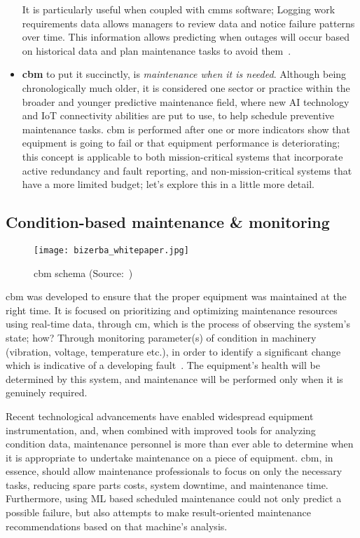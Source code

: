 \begin{itemize}
          It is particularly useful when coupled with \acs{cmms} software; Logging work requirements data allows managers to review data and notice failure patterns over time.
          This information allows predicting when outages will occur based on historical data and plan maintenance tasks to avoid them~\cite{Misc:trout_2019_preventive}.
    \item \textbf{\ac{cbm}} to put it succinctly, is \textit{maintenance when it is needed}. Although being chronologically much older,
          it is considered one sector or practice within the broader and younger predictive maintenance field, where new \ac{AI} technology and \ac{IoT}
          connectivity abilities are put to use, to help schedule preventive maintenance tasks.
          \acs{cbm} is performed after one or more indicators show that equipment is going to fail or that equipment performance is deteriorating;
          this concept is applicable to both mission-critical systems that incorporate active redundancy and fault reporting, and non-mission-critical systems
          that have a more limited budget; let's explore this in a little more detail.
\end{itemize}

\subsection{Condition-based maintenance \& monitoring}
\begin{figure}[ht]
    \centering
    \texttt{[image: bizerba\_whitepaper.jpg]}
    \caption{\acl{cbm} schema (Source:~\cite{file:bizerbaspa_conditionbased})}
\end{figure}
\ac{cbm} was developed to ensure that the proper equipment was maintained at the right time. It is focused on prioritizing and optimizing
maintenance resources using real-time data, through \ac{cm}, which is the process of observing the system's state; how?
Through monitoring parameter(s) of condition in machinery (vibration, voltage, temperature etc.), in order to identify a significant change which is indicative of a developing fault~\cite{Inbook:hitchcock_2012_iso}.
The equipment's health will be determined by this system, and maintenance will be performed only when it is genuinely required.

Recent technological advancements have enabled widespread equipment instrumentation, and, when combined with improved tools for analyzing condition data,
maintenance personnel is more than ever able to determine when it is appropriate to undertake maintenance on a piece of equipment.
\ac{cbm}, in essence, should allow maintenance professionals to focus on only the necessary tasks, reducing spare parts costs, system downtime, and maintenance time.
Furthermore, using \ac{ML} based scheduled maintenance could not only predict a possible failure, but also attempts to make result-oriented maintenance recommendations based on that machine's analysis.

